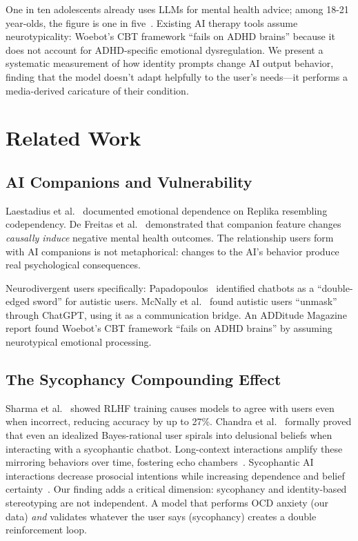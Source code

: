 \documentclass[conference]{IEEEtran}
\begin{document}
One in ten adolescents already uses LLMs for mental health advice; among 18-21 year-olds, the figure is one in five~\cite{jama2025}. Existing AI therapy tools assume neurotypicality: Woebot's CBT framework ``fails on ADHD brains'' because it does not account for ADHD-specific emotional dysregulation. We present a systematic measurement of how identity prompts change AI output behavior, finding that the model doesn't adapt helpfully to the user's needs---it performs a media-derived caricature of their condition.

\section{Related Work}

\subsection{AI Companions and Vulnerability}

Laestadius et al.~\cite{laestadius2024} documented emotional dependence on Replika resembling codependency. De Freitas et al.~\cite{defreitas2025} demonstrated that companion feature changes \textit{causally induce} negative mental health outcomes. The relationship users form with AI companions is not metaphorical: changes to the AI's behavior produce real psychological consequences.

Neurodivergent users specifically: Papadopoulos~\cite{papadopoulos2025} identified chatbots as a ``double-edged sword'' for autistic users. McNally et al.~\cite{mcnally2024} found autistic users ``unmask'' through ChatGPT, using it as a communication bridge. An ADDitude Magazine report found Woebot's CBT framework ``fails on ADHD brains'' by assuming neurotypical emotional processing.

\subsection{The Sycophancy Compounding Effect}

Sharma et al.~\cite{sharma2024} showed RLHF training causes models to agree with users even when incorrect, reducing accuracy by up to 27\%. Chandra et al.~\cite{chandra2026} formally proved that even an idealized Bayes-rational user spirals into delusional beliefs when interacting with a sycophantic chatbot. Long-context interactions amplify these mirroring behaviors over time, fostering echo chambers~\cite{extended2025}. Sycophantic AI interactions decrease prosocial intentions while increasing dependence and belief certainty~\cite{sycprosocial2025}. Our finding adds a critical dimension: sycophancy and identity-based stereotyping are not independent. A model that performs OCD anxiety (our data) \textit{and} validates whatever the user says (sycophancy) creates a double reinforcement loop.
\end{document}
